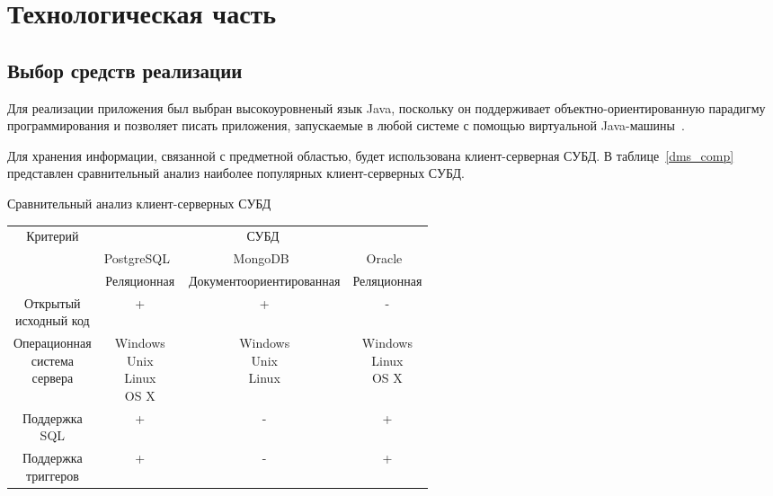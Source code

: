 \chapter{Технологическая часть}

\section{Выбор средств реализации}

Для реализации приложения был выбран высокоуровненый язык Java, поскольку он поддерживает объектно-ориентированную парадигму программирования и позволяет писать приложения, запускаемые в любой системе с помощью виртуальной Java-машины~\cite{java}.

Для хранения информации, связанной с предметной областью, будет использована клиент-серверная СУБД. В таблице~\ref{dms_comp} представлен сравнительный анализ наиболее популярных клиент-серверных СУБД.

\begin{center}
	\begin{threeparttable}
		\captionsetup{justification=raggedright,singlelinecheck=off}
		\caption{\label{dms_comp}Сравнительный анализ клиент-серверных СУБД}
		\centering
		\begin{tabular}{|c|c|c|c|}
			\hline
			\multirow{2}{*}{Критерий} & \multicolumn{3}{|c|}{СУБД} \\
			\cline{2-4}
			& PostgreSQL~\cite{postgresql} & MongoDB~\cite{mssql} & Oracle~\cite{oracle} \\
			\hline
			\specialcell{Тип} & Реляционная & Документоориентированная & Реляционная \\
			\hline
			\specialcell{Открытый\\исходный код} & + & + & - \\
			\hline
			\specialcell{Операционная\\система\\сервера} & \specialcell{Windows\\Unix\\Linux\\OS X} & \specialcell{Windows\\Unix\\Linux} & \specialcell{Windows\\Linux\\OS X} \\
			\hline
			\specialcell{Поддержка\\SQL} & + & - & + \\
			\hline
			\specialcell{Поддержка\\триггеров} & + & - & + \\
			\hline
		\end{tabular}
	\end{threeparttable}
\end{center}

